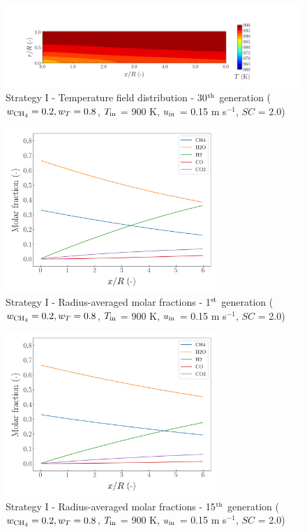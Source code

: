 \documentclass[preprint,12pt]{elsarticle}
\begin{document}
\begin{figure}[h!]
\centering
\includegraphics[width=190mm]{results/5/20C_80T/GEN30-TFIELD.png}
\caption{\label{fig:5R2080G30-TField} Strategy I - Temperature field distribution - 30$^{\rm{th}}$ generation ($w_{\rm{CH_4}} = 0.2, w_T = 0.8$, $T_{\rm{in}}$ = 900 K, $u_{\rm{in}}$ = 0.15 m s$^{-1}$, $SC$ = 2.0)}
\end{figure}


\begin{figure}[h!]
\centering
\includegraphics[width=80mm]{results/5/20C_80T/GEN1-AVG.png}
\caption{\label{fig:5R2080G1-avg} Strategy I - Radius-averaged molar fractions - 1$^{\rm{st}}$ generation ($w_{\rm{CH_4}} = 0.2, w_T = 0.8$, $T_{\rm{in}}$ = 900 K, $u_{\rm{in}}$ = 0.15 m s$^{-1}$, $SC$ = 2.0)}
\end{figure}

\begin{figure}[h!]
\centering
\includegraphics[width=80mm]{results/5/20C_80T/GEN15-AVG.png}
\caption{\label{fig:5R2080G15-avg} Strategy I - Radius-averaged molar fractions - 15$^{\rm{th}}$ generation ($w_{\rm{CH_4}} = 0.2, w_T = 0.8$, $T_{\rm{in}}$ = 900 K, $u_{\rm{in}}$ = 0.15 m s$^{-1}$, $SC$ = 2.0)}
\end{figure}
\end{document}

